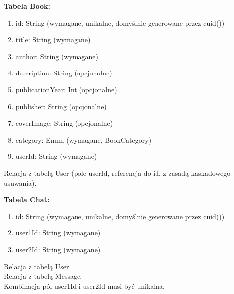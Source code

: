 \documentclass[12pt]{article}
\begin{document}
\noindent\hspace{0.6cm}\textbf{\large Tabela Book:}\vspace{-10pt}
\begin{enumerate}[label=\textbullet, leftmargin=1.2cm, itemsep=-6pt]
	\item id: String (wymagane, unikalne, domyślnie generowane przez cuid())
	\item title: String (wymagane)
	\item author: String (wymagane)
	\item description: String (opcjonalne)
	\item publicationYear: Int (opcjonalne)
	\item publisher: String (opcjonalne)
	\item coverImage: String (opcjonalne)
	\item category: Enum (wymagane, BookCategory)
	\item userId: String (wymagane)
\end{enumerate}
\vspace{-10pt}
\begin{adjustwidth}{0.5cm}{0pt}
	Relacja z tabelą User (pole userId, referencja do id, z zasadą kaskadowego usuwania).
\end{adjustwidth}
\vspace{10pt}

\noindent\hspace{0.6cm}\textbf{\large Tabela Chat:}\vspace{-10pt}
\begin{enumerate}[label=\textbullet, leftmargin=1.2cm, itemsep=-6pt]
	\item id: String (wymagane, unikalne, domyślnie generowane przez cuid())
	\item user1Id: String (wymagane)
	\item user2Id: String (wymagane)
\end{enumerate}
\vspace{-10pt}
\begin{adjustwidth}{0.5cm}{0pt}
	Relacja z tabelą User.\\
	Relacja z tabelą Message.\\
	Kombinacja pól user1Id i user2Id musi być unikalna.
\end{adjustwidth}
\vspace{10pt}
\end{document}
